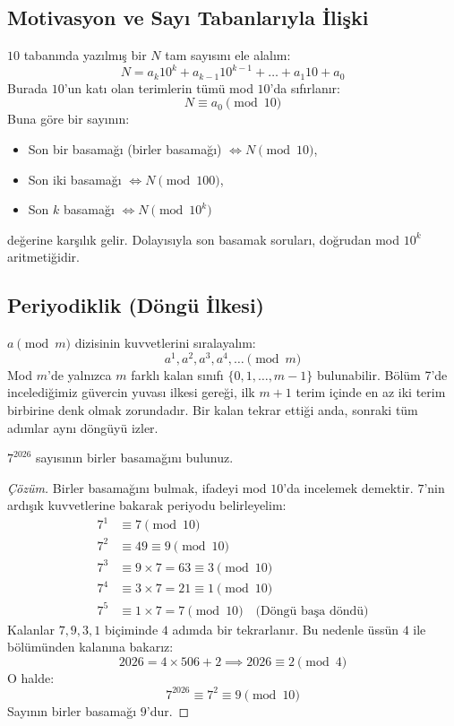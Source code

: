 \subsection{Motivasyon ve Sayı Tabanlarıyla İlişki}

$10$ tabanında yazılmış bir $N$ tam sayısını ele alalım:
\[
N = a_k 10^k + a_{k-1} 10^{k-1} + \dots + a_1 10 + a_0
\]
Burada $10$'un katı olan terimlerin tümü mod $10$'da sıfırlanır:
\[
N \equiv a_0 \pmod{10}
\]
Buna göre bir sayının:
\begin{itemize}
    \item Son bir basamağı (birler basamağı) $\iff N \pmod{10}$,
    \item Son iki basamağı $\iff N \pmod{100}$,
    \item Son $k$ basamağı $\iff N \pmod{10^k}$
\end{itemize}
değerine karşılık gelir. Dolayısıyla son basamak soruları, doğrudan mod $10^k$ aritmetiğidir.

\subsection{Periyodiklik (Döngü İlkesi)}

$a \pmod m$ dizisinin kuvvetlerini sıralayalım:
\[
a^1, a^2, a^3, a^4, \dots \pmod m
\]
Mod $m$'de yalnızca $m$ farklı kalan sınıfı $\{0, 1, \dots, m-1\}$ bulunabilir. Bölüm 7'de incelediğimiz güvercin yuvası ilkesi gereği, ilk $m+1$ terim içinde en az iki terim birbirine denk olmak zorundadır. Bir kalan tekrar ettiği anda, sonraki tüm adımlar aynı döngüyü izler.

\begin{example}
$7^{2026}$ sayısının birler basamağını bulunuz.
\end{example}

\begin{proof}[Çözüm]
Birler basamağını bulmak, ifadeyi mod $10$'da incelemek demektir. $7$'nin ardışık kuvvetlerine bakarak periyodu belirleyelim:
\begin{align*}
7^1 &\equiv 7 \pmod{10} \\
7^2 &\equiv 49 \equiv 9 \pmod{10} \\
7^3 &\equiv 9 \times 7 = 63 \equiv 3 \pmod{10} \\
7^4 &\equiv 3 \times 7 = 21 \equiv 1 \pmod{10} \\
7^5 &\equiv 1 \times 7 = 7 \pmod{10} \quad \text{(Döngü başa döndü)}
\end{align*}
Kalanlar $7, 9, 3, 1$ biçiminde $4$ adımda bir tekrarlanır. Bu nedenle üssün $4$ ile bölümünden kalanına bakarız:
\[
2026 = 4 \times 506 + 2 \implies 2026 \equiv 2 \pmod 4
\]
O halde:
\[
7^{2026} \equiv 7^2 \equiv 9 \pmod{10}
\]
Sayının birler basamağı $9$'dur.
\end{proof}

